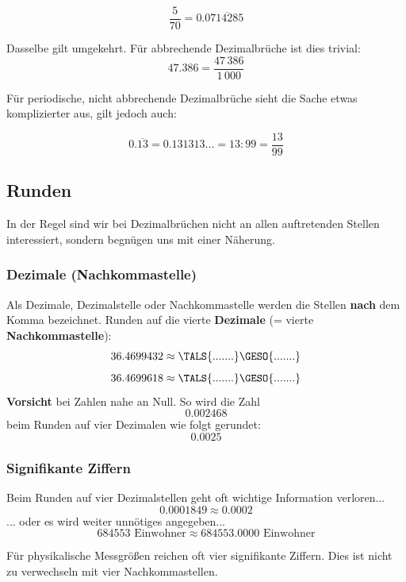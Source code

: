 $$\frac{5}{70} = 0.0\overline{714285}$$

Dasselbe gilt umgekehrt. Für abbrechende Dezimalbrüche ist dies
trivial:
$$47.386 = \frac{47\,386}{1\,000}$$

Für periodische, nicht abbrechende Dezimalbrüche sieht die Sache etwas komplizierter aus,
gilt jedoch auch:

$$0.\overline{13} = 0.131313... = 13: 99 = \frac{13}{99}$$


\newpage


\subsection{Runden}
In der Regel sind wir bei Dezimalbrüchen nicht an allen auftretenden
Stellen interessiert, sondern begnügen uns mit einer Näherung.

\subsubsection{Dezimale (Nachkommastelle)}
Als Dezimale, Dezimalstelle oder Nachkommastelle werden die Stellen \textbf{nach} dem Komma bezeichnet.
Runden auf die vierte \textbf{Dezimale} (= vierte \textbf{Nachkommastelle}):
$$ 36.4699432 \approx  \TALS{.......}\GESO{.......}$$
$$ 36.4699618 \approx\TALS{.......}\GESO{.......}$$
\textbf{Vorsicht} bei Zahlen nahe an Null. So wird die Zahl
$$0.002468$$ beim Runden auf vier Dezimalen wie folgt gerundet:
$$0.0025$$
\newpage


\subsubsection{Signifikante Ziffern}
Beim Runden auf vier Dezimalstellen geht oft wichtige Information verloren...
$$ 0.0001849 \approx  0.0002$$
... oder es wird weiter unnötiges angegeben...
$$ 684553 \textrm{\ Einwohner} \approx  684553.0000 \textrm{\ Einwohner}$$

Für physikalische Messgrößen reichen oft vier
signifikante
Ziffern. Dies ist nicht zu verwechseln mit vier Nachkommastellen.


